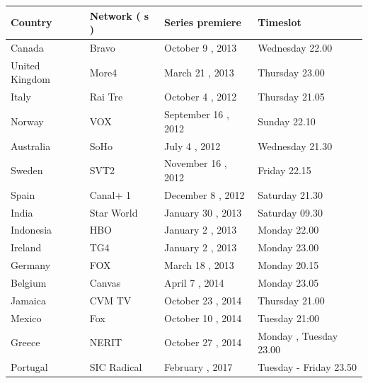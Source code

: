 \documentclass{article}
\begin{document}
\begin{tabular}{llll}
\toprule
Country & Network ( s ) & Series premiere & Timeslot \\
\midrule
Canada & Bravo & October 9 , 2013 & Wednesday 22.00 \\
United Kingdom & More4 & March 21 , 2013 & Thursday 23.00 \\
Italy & Rai Tre & October 4 , 2012 & Thursday 21.05 \\
Norway & VOX & September 16 , 2012 & Sunday 22.10 \\
Australia & SoHo & July 4 , 2012 & Wednesday 21.30 \\
Sweden & SVT2 & November 16 , 2012 & Friday 22.15 \\
Spain & Canal+ 1 & December 8 , 2012 & Saturday 21.30 \\
India & Star World & January 30 , 2013 & Saturday 09.30 \\
Indonesia & HBO & January 2 , 2013 & Monday 22.00 \\
Ireland & TG4 & January 2 , 2013 & Monday 23.00 \\
Germany & FOX & March 18 , 2013 & Monday 20.15 \\
Belgium & Canvas & April 7 , 2014 & Monday 23.05 \\
Jamaica & CVM TV & October 23 , 2014 & Thursday 21.00 \\
Mexico & Fox & October 10 , 2014 & Tuesday 21:00 \\
Greece & NERIT & October 27 , 2014 & Monday , Tuesday 23.00 \\
Portugal & SIC Radical & February , 2017 & Tuesday - Friday 23.50 \\
\bottomrule
\end{tabular}
\end{document}
